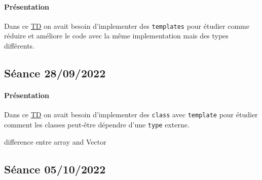 \documentclass{article}
\begin{document}
\paragraph{Présentation}Dans ce \href{https://perso.ensta-paris.fr/~bmonsuez/Cours/doku.php?id=in204:seances:seance3}{TD} on avait besoin d'implementer des \texttt{templates} pour étudier comme réduire et améliore le code avec la même implementation mais des types différents.
\begin{scriptsize}\mycode
    
\end{scriptsize}
\begin{scriptsize}\mycode
    
\end{scriptsize}

\newpage\subsection{Séance 28/09/2022}
\paragraph{Présentation}Dans ce \href{https://perso.ensta-paris.fr/~bmonsuez/Cours/doku.php?id=in204:seances:seance4}{TD} on avait besoin d'implementer des \texttt{class} avec \texttt{template} pour étudier comment les classes peut-être dépendre d'une \texttt{type} externe.
\begin{scriptsize}\mycode
    
\end{scriptsize}
\begin{scriptsize}\mycode
    
\end{scriptsize}
\begin{scriptsize}\mycode
    
\end{scriptsize}

\begin{scriptsize}\mycode
    
\end{scriptsize}
difference entre array and Vector

\newpage\subsection{Séance 05/10/2022}
\end{document}
